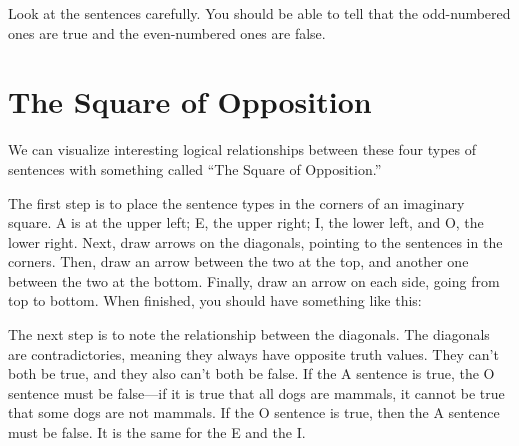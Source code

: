 \documentclass[../logic-text.tex]{subfiles}
\begin{document}
Look at the sentences carefully. You should be able to tell that the odd-numbered ones are true and the even-numbered ones are false.

\section{The Square of Opposition}
\label{sec:square-opposition}

We can visualize interesting logical relationships between these four types of sentences with something called \enquote{The Square of Opposition.}

The first step is to place the sentence types in the corners of an imaginary square. A is at the upper left; E, the upper right; I, the lower left, and O, the lower right. Next, draw arrows on the diagonals, pointing to the sentences in the corners. Then, draw an arrow between the two at the top, and another one between the two at the bottom. Finally, draw an arrow on each side, going from top to bottom. When finished, you should have something like this:


\medskip
{}

The next step is to note the relationship between the diagonals. The diagonals are contradictories, meaning they always have opposite truth values. They can't both be true, and they also can't both be false.  If the A sentence is true, the O sentence must be false---if it is true that all dogs are mammals, it cannot be true that some dogs are not mammals. If the O sentence is true, then the A sentence must be false. It is the same for the E and the I. 

\medskip
{}
\end{document}
